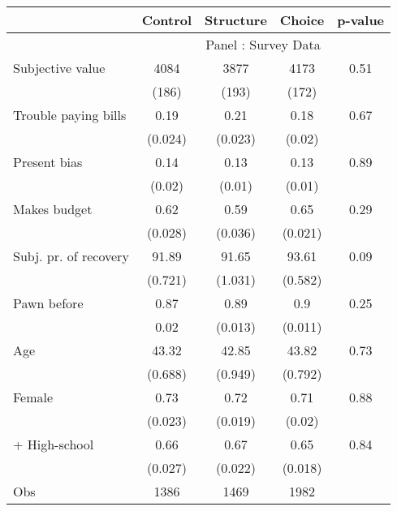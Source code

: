 \begin{tabular}{lcccc}
\toprule
      & \multicolumn{1}{p{4.545em}}{Control} & \multicolumn{1}{p{4.955em}}{Structure} & \multicolumn{1}{p{3.455em}}{Choice} & \multicolumn{1}{p{3.455em}}{p-value} \\
\midrule
      & \multicolumn{4}{c}{Panel : Survey Data} \\
\midrule
\midrule
Subjective value & 4084  & 3877  & 4173  & 0.51 \\
      & (186) & (193) & (172) &  \\
Trouble paying bills & 0.19  & 0.21  & 0.18  & 0.67 \\
      & (0.024) & (0.023) & (0.02) &  \\
Present bias & 0.14  & 0.13  & 0.13  & 0.89 \\
      & (0.02) & (0.01) & (0.01) &  \\
Makes budget & 0.62  & 0.59  & 0.65  & 0.29 \\
      & (0.028) & (0.036) & (0.021) &  \\
Subj. pr. of recovery & 91.89 & 91.65 & 93.61 & 0.09 \\
      & (0.721) & (1.031) & (0.582) &  \\
Pawn before & 0.87  & 0.89  & 0.9   & 0.25 \\
      & 0.02  & (0.013) & (0.011) &  \\
Age   & 43.32 & 42.85 & 43.82 & 0.73 \\
      & (0.688) & (0.949) & (0.792) &  \\
Female & 0.73  & 0.72  & 0.71  & 0.88 \\
      & (0.023) & (0.019) & (0.02) &  \\
+ High-school & 0.66  & 0.67  & 0.65  & 0.84 \\
      & (0.027) & (0.022) & (0.018) &  \\
\midrule
Obs   & 1386  & 1469  & 1982  &  \\
\bottomrule
\bottomrule
\end{tabular}%
